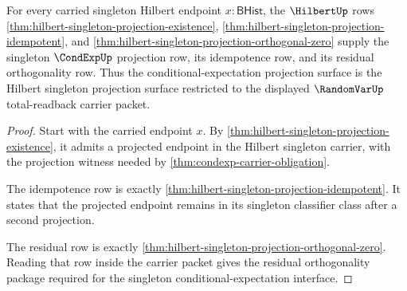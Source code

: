 \begin{theorem}
\label{thm:condexp-projection-obligation}
For every carried singleton Hilbert endpoint $x:\mathsf{BHist}$, the
$\HilbertUp$ rows
\autoref{thm:hilbert-singleton-projection-existence},
\autoref{thm:hilbert-singleton-projection-idempotent}, and
\autoref{thm:hilbert-singleton-projection-orthogonal-zero} supply the
singleton $\CondExpUp$ projection row, its idempotence row, and its residual
orthogonality row. Thus the conditional-expectation projection surface is the
Hilbert singleton projection surface restricted to the displayed
$\RandomVarUp$ total-readback carrier packet.
\end{theorem}
\begin{proof}
Start with the carried endpoint $x$. By
\autoref{thm:hilbert-singleton-projection-existence}, it admits a projected
endpoint in the Hilbert singleton carrier, with the projection witness needed
by \autoref{thm:condexp-carrier-obligation}.

The idempotence row is exactly
\autoref{thm:hilbert-singleton-projection-idempotent}. It states that the
projected endpoint remains in its singleton classifier class after a second
projection.

The residual row is exactly
\autoref{thm:hilbert-singleton-projection-orthogonal-zero}. Reading that row
inside the carrier packet gives the residual orthogonality package required
for the singleton conditional-expectation interface.
\end{proof}

